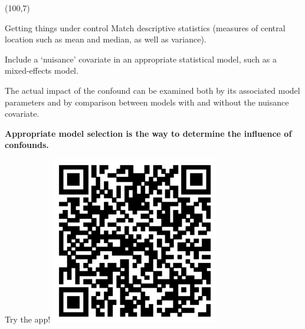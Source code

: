 \documentclass[final]{beamer}
\begin{document}
\begin{frame}{}
\begin{textblock}{48}
\end{textblock}

\begin{textblock}{18}(100,7)

\begin{block}{Getting things under control}
Match descriptive statistics (measures of central location such as mean and median, as well as variance).

\vspace{0.8cm}

Include a `nuisance' covariate in an appropriate statistical model, such as a mixed-effects model.

\vspace{0.8cm}

The actual impact of the confound can be examined both by its associated model parameters and by comparison between models with and without the nuisance covariate.

\vspace{0.8cm}

\textbf{Appropriate model selection is the way to determine the influence of confounds.}

\end{block}

%
%

\begin{block}{Try the app!}
\centering
\includegraphics[width=0.55\textwidth]{shinyapps-url.eps}
%
\end{block}


\end{textblock}
\end{frame}
\end{document}
